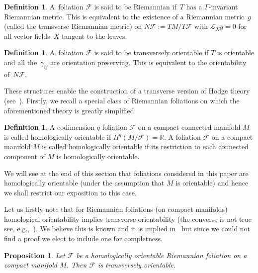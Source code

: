 \documentclass[pdftex]{sigma}
\numberwithin{equation}{section}
\newtheorem{prop}[tw]{Proposition}
\theoremstyle{definition}
\newtheorem{defi}[tw]{Definition}
\begin{document}
\begin{defi}
A~foliation $\mathcal{F}$ is said to be Riemannian if~$T$ has a $\Gamma$-invariant Riemannian metric. This is equivalent to the existence of a Riemannian metric~$g$ (called the transverse Riemannian metric) on $N\mathcal{F}:=TM\slash T\mathcal{F}$ with $\mathcal{L}_Xg=0$ for all vector fields~$X$ tangent to the leaves.
\end{defi}
\begin{defi}
A~foliation $\mathcal{F}$ is said to be transversely orientable if $T$ is orientable and all the~$\gamma_{ij}$ are orientation preserving. This is equivalent to the orientability of~$N\mathcal{F}$.
\end{defi}
These structures enable the construction of a transverse version of Hodge theory (see~\cite{E1}). Firstly, we recall a special class of Riemannian foliations on which the aforementioned theory is greatly simplified.

\begin{defi} A codimension $q$ foliation $\mathcal{F}$ on a compact connected manifold $M$ is called homologically orientable if $H^{q}(M\slash\mathcal{F})=\mathbb{R}$. A foliation $\mathcal{F}$ on a compact manifold $M$ is called homologically orientable if its restriction to each connected component of $M$ is homologically orientable.
\end{defi}
We will see at the end of this section that foliations considered in this paper are homologically orientable (under the assumption that $M$ is orientable) and hence we shall restrict our exposition to this case.

Let us firstly note that for Riemannian foliations (on compact manifolds) homological orientability implies transverse orientability (the converse is not true see, e.g.,~\cite{E1}). We believe this is known and it is implied in~\cite{E1} but since we could not find a proof we elect to include one for completness.
\begin{prop} Let $\mathcal{F}$ be a homologically orientable Riemannian foliation on a compact manifold $M$. Then $\mathcal{F}$ is transversely orientable.
\end{prop}
\end{document}
